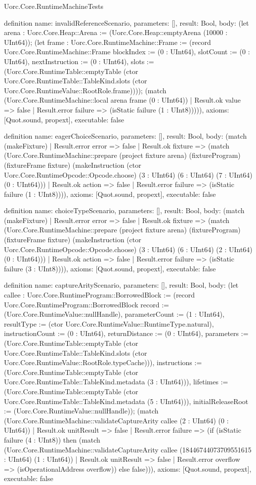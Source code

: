 \begin{lexlean}{Uorc.Core.RuntimeMachineTests}
\begin{semanticmodule}
definition{
  name: invalidReferenceScenario,
  parameters: [],
  result: Bool,
  body: (let arena : Uorc.Core.Heap::Arena := (Uorc.Core.Heap::emptyArena (10000 : UInt64)); (let frame : Uorc.Core.RuntimeMachine::Frame := (record Uorc.Core.RuntimeMachine::Frame {blockIndex := (0 : UInt64), slotCount := (0 : UInt64), nextInstruction := (0 : UInt64), slots := (Uorc.Core.RuntimeTable::emptyTable (ctor Uorc.Core.RuntimeTable::TableKind.slots (ctor Uorc.Core.RuntimeValue::RootRole.frame)))}); (match (Uorc.Core.RuntimeMachine::local arena frame (0 : UInt64))
    | Result.ok value => false
    | Result.error failure => (isStatic failure (1 : UInt8))))),
  axioms: [Quot.sound, propext],
  executable: false
}

definition{
  name: eagerChoiceScenario,
  parameters: [],
  result: Bool,
  body: (match (makeFixture)
    | Result.error error => false
    | Result.ok fixture => (match (Uorc.Core.RuntimeMachine::prepare (project fixture arena) (fixtureProgram) (fixtureFrame fixture) (makeInstruction (ctor Uorc.Core.RuntimeOpcode::Opcode.choose) (3 : UInt64) (6 : UInt64) (7 : UInt64) (0 : UInt64)))
      | Result.ok action => false
      | Result.error failure => (isStatic failure (1 : UInt8)))),
  axioms: [Quot.sound, propext],
  executable: false
}

definition{
  name: choiceTypeScenario,
  parameters: [],
  result: Bool,
  body: (match (makeFixture)
    | Result.error error => false
    | Result.ok fixture => (match (Uorc.Core.RuntimeMachine::prepare (project fixture arena) (fixtureProgram) (fixtureFrame fixture) (makeInstruction (ctor Uorc.Core.RuntimeOpcode::Opcode.choose) (3 : UInt64) (6 : UInt64) (2 : UInt64) (0 : UInt64)))
      | Result.ok action => false
      | Result.error failure => (isStatic failure (3 : UInt8)))),
  axioms: [Quot.sound, propext],
  executable: false
}

definition{
  name: captureArityScenario,
  parameters: [],
  result: Bool,
  body: (let callee : Uorc.Core.RuntimeProgram::BorrowedBlock := (record Uorc.Core.RuntimeProgram::BorrowedBlock {record := (Uorc.Core.RuntimeValue::nullHandle), parameterCount := (1 : UInt64), resultType := (ctor Uorc.Core.RuntimeValue::RuntimeType.natural), instructionCount := (0 : UInt64), returnDistance := (0 : UInt64), parameters := (Uorc.Core.RuntimeTable::emptyTable (ctor Uorc.Core.RuntimeTable::TableKind.slots (ctor Uorc.Core.RuntimeValue::RootRole.typeCache))), instructions := (Uorc.Core.RuntimeTable::emptyTable (ctor Uorc.Core.RuntimeTable::TableKind.metadata (3 : UInt64))), lifetimes := (Uorc.Core.RuntimeTable::emptyTable (ctor Uorc.Core.RuntimeTable::TableKind.metadata (5 : UInt64))), initialReleaseRoot := (Uorc.Core.RuntimeValue::nullHandle)}); (match (Uorc.Core.RuntimeMachine::validateCaptureArity callee (2 : UInt64) (0 : UInt64))
    | Result.ok unitResult => false
    | Result.error failure => (if (isStatic failure (4 : UInt8)) then (match (Uorc.Core.RuntimeMachine::validateCaptureArity callee (18446744073709551615 : UInt64) (1 : UInt64))
      | Result.ok unitResult => false
      | Result.error overflow => (isOperationalAddress overflow)) else false))),
  axioms: [Quot.sound, propext],
  executable: false
}


\end{semanticmodule}
\end{lexlean}
